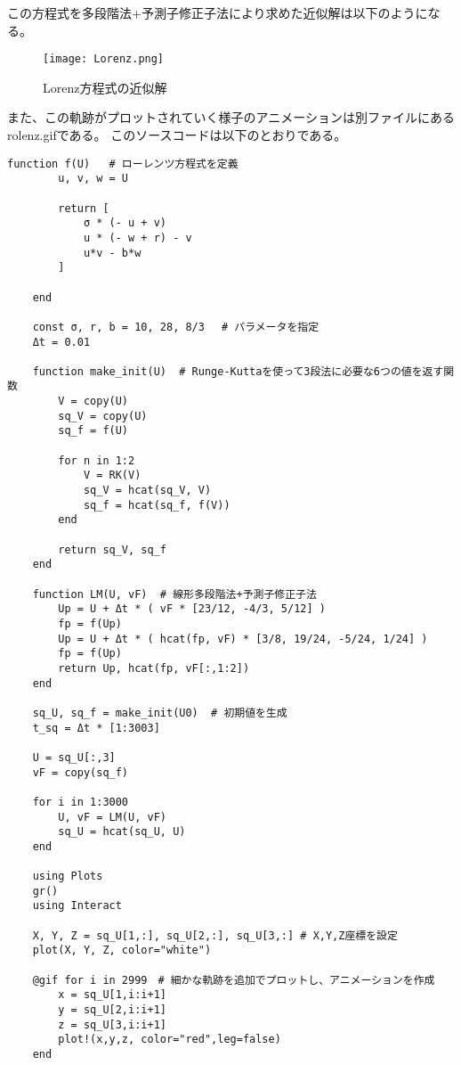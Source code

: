 \documentclass[12pt]{ltjsarticle}
\begin{document}
この方程式を多段階法+予測子修正子法により求めた近似解は以下のようになる。
\begin{figure}[htbp]
    \begin{center}
    \texttt{[image: Lorenz.png]}
    \caption{Lorenz方程式の近似解}
        \end{center}
\end{figure}
また、この軌跡がプロットされていく様子のアニメーションは別ファイルにあるrolenz.gifである。
このソースコードは以下のとおりである。
\begin{lstlisting}[basicstyle=\ttfamily\footnotesize, frame=single]
    function f(U)   # ローレンツ方程式を定義
        u, v, w = U
        
        return [
            σ * (- u + v)
            u * (- w + r) - v
            u*v - b*w
        ]
        
    end
    
    const σ, r, b = 10, 28, 8/3 　# パラメータを指定
    Δt = 0.01
    
    function make_init(U)  # Runge-Kuttaを使って3段法に必要な6つの値を返す関数
        V = copy(U) 
        sq_V = copy(U)
        sq_f = f(U)
        
        for n in 1:2
            V = RK(V)
            sq_V = hcat(sq_V, V)
            sq_f = hcat(sq_f, f(V))
        end
        
        return sq_V, sq_f
    end
    
    function LM(U, vF)  # 線形多段階法+予測子修正子法
        Up = U + Δt * ( vF * [23/12, -4/3, 5/12] )
        fp = f(Up)
        Up = U + Δt * ( hcat(fp, vF) * [3/8, 19/24, -5/24, 1/24] )
        fp = f(Up)
        return Up, hcat(fp, vF[:,1:2])
    end
    
    sq_U, sq_f = make_init(U0)  # 初期値を生成
    t_sq = Δt * [1:3003]
    
    U = sq_U[:,3]
    vF = copy(sq_f)
    
    for i in 1:3000
        U, vF = LM(U, vF)
        sq_U = hcat(sq_U, U)
    end
    
    using Plots
    gr()
    using Interact
    
    X, Y, Z = sq_U[1,:], sq_U[2,:], sq_U[3,:] # X,Y,Z座標を設定
    plot(X, Y, Z, color="white")
    
    @gif for i in 2999　# 細かな軌跡を追加でプロットし、アニメーションを作成
        x = sq_U[1,i:i+1]
        y = sq_U[2,i:i+1]
        z = sq_U[3,i:i+1]
        plot!(x,y,z, color="red",leg=false)
    end
    \end{lstlisting}
\end{document}
